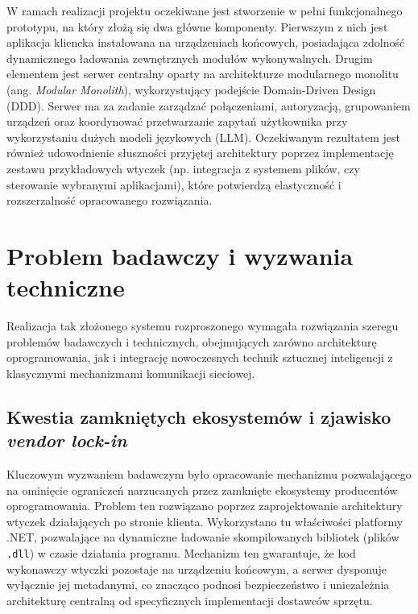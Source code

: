 W ramach realizacji projektu oczekiwane jest stworzenie w pełni funkcjonalnego prototypu, na który złożą się dwa główne komponenty. Pierwszym z nich jest aplikacja kliencka instalowana na urządzeniach końcowych, posiadająca zdolność dynamicznego ładowania zewnętrznych modułów wykonywalnych. Drugim elementem jest serwer centralny oparty na architekturze modularnego monolitu (ang. \textit{Modular Monolith}), wykorzystujący podejście Domain-Driven Design (DDD). Serwer ma za zadanie zarządzać połączeniami, autoryzacją, grupowaniem urządzeń oraz koordynować przetwarzanie zapytań użytkownika przy wykorzystaniu dużych modeli językowych (LLM). Oczekiwanym rezultatem jest również udowodnienie słuszności przyjętej architektury poprzez implementację zestawu przykładowych wtyczek (np. integracja z systemem plików, czy sterowanie wybranymi aplikacjami), które potwierdzą elastyczność i rozszerzalność opracowanego rozwiązania.

\section{Problem badawczy i wyzwania techniczne}
\label{sec:problem_badawczy}
Realizacja tak złożonego systemu rozproszonego wymagała rozwiązania szeregu problemów badawczych i technicznych, obejmujących zarówno architekturę oprogramowania, jak i integrację nowoczesnych technik sztucznej inteligencji z klasycznymi mechanizmami komunikacji sieciowej.

\subsection{Kwestia zamkniętych ekosystemów i zjawisko \textit{vendor lock-in}}
\label{subsec:vendor_lock_in}
Kluczowym wyzwaniem badawczym było opracowanie mechanizmu pozwalającego na ominięcie ograniczeń narzucanych przez zamknięte ekosystemy producentów oprogramowania. Problem ten rozwiązano poprzez zaprojektowanie architektury wtyczek działających po stronie klienta. Wykorzystano tu właściwości platformy .NET, pozwalające na dynamiczne ładowanie skompilowanych bibliotek (plików \texttt{.dll}) w czasie działania programu. Mechanizm ten gwarantuje, że kod wykonawczy wtyczki pozostaje na urządzeniu końcowym, a serwer dysponuje wyłącznie jej metadanymi, co znacząco podnosi bezpieczeństwo i uniezależnia architekturę centralną od specyficznych implementacji dostawców sprzętu.

